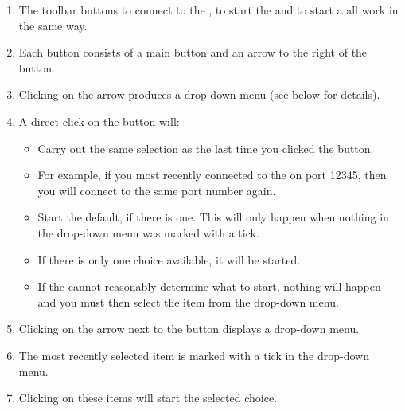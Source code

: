 
\begin{enumerate}
\item The toolbar buttons to connect to the \gdagent, to start the \gdaut{} and to start a \gdsuite{} all work in the same way.
\item Each button consists of a main button and an arrow to the right of the button. 
\item Clicking on the arrow produces a drop-down menu (see below for details).
\item A direct click on the button will:
\begin{itemize}
\item Carry out the same selection as the last time you clicked the button.
\item For example, if you most recently connected to the \gdagent on port 12345, then you will connect to the same port number again.
\item Start the default, if there is one. This will only happen when nothing in the drop-down menu was marked with a tick.
\item If there is only one choice available, it will be started.
\item If the \ite{}  cannot reasonably determine what to start, nothing will happen and you must then select the item from the drop-down menu. 
\end{itemize}
\item Clicking on the arrow next to the button displays a drop-down menu.
\item The most recently selected item is marked with a tick in the drop-down menu.
\item Clicking on these items will start the selected choice.
\end{enumerate}

